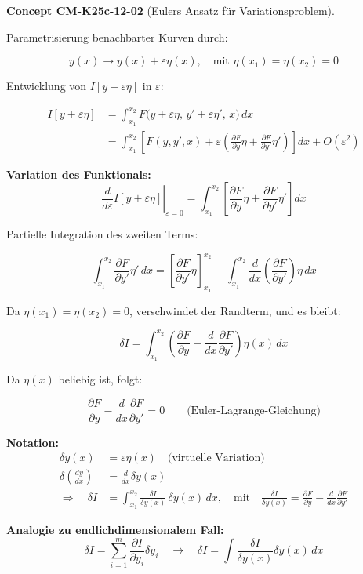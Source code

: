 \documentclass[10pt, letterpaper]{article}
\newcommand{\CustomHeading}[3]{%
  \par\medskip\noindent%
  \textbf{#1 #2} \textnormal{(#3)}.\enskip%
}
\newenvironment{CONC}[2]{\CustomHeading{Concept}{#1}{#2}}{}
\begin{document}
\begin{CONC}{CM-K25c-12-02}{Eulers Ansatz für Variationsproblem}
Parametrisierung benachbarter Kurven durch:

\[
y(x) \longrightarrow y(x) + \varepsilon \eta(x), \quad \text{mit } \eta(x_1) = \eta(x_2) = 0
\]

Entwicklung von \( I[y + \varepsilon \eta] \) in \( \varepsilon \):

\begin{align*}
I[y + \varepsilon \eta] &= \int_{x_1}^{x_2} F\big(y + \varepsilon \eta, \, y' + \varepsilon \eta', \, x\big)\, dx \\
&= \int_{x_1}^{x_2} \left[ F(y, y', x) + \varepsilon \left( \frac{\partial F}{\partial y}\eta + \frac{\partial F}{\partial y'}\eta' \right) \right] dx + O(\varepsilon^2)
\end{align*}

\textbf{Variation des Funktionals:}
\[
\left. \frac{d}{d\varepsilon} I[y + \varepsilon \eta] \right|_{\varepsilon=0} = \int_{x_1}^{x_2} \left[ \frac{\partial F}{\partial y} \eta + \frac{\partial F}{\partial y'} \eta' \right] dx
\]

Partielle Integration des zweiten Terms:

\[
\int_{x_1}^{x_2} \frac{\partial F}{\partial y'} \eta'\, dx = 
\left[ \frac{\partial F}{\partial y'} \eta \right]_{x_1}^{x_2}
- \int_{x_1}^{x_2} \frac{d}{dx} \left( \frac{\partial F}{\partial y'} \right) \eta\, dx
\]

Da \( \eta(x_1) = \eta(x_2) = 0 \), verschwindet der Randterm, und es bleibt:

\[
\delta I = \int_{x_1}^{x_2} \left( \frac{\partial F}{\partial y} - \frac{d}{dx} \frac{\partial F}{\partial y'} \right) \eta(x)\, dx
\]

Da \( \eta(x) \) beliebig ist, folgt:

\[
\boxed{
\frac{\partial F}{\partial y} - \frac{d}{dx} \frac{\partial F}{\partial y'} = 0
}
\qquad \text{(Euler-Lagrange-Gleichung)}
\]

\vspace{1em}
\textbf{Notation:}
\begin{align*}
\delta y(x) &= \varepsilon \eta(x) \quad \text{(virtuelle Variation)} \\
\delta \left( \frac{dy}{dx} \right) &= \frac{d}{dx} \delta y(x) \\
\Rightarrow \quad \delta I &= \int_{x_1}^{x_2} \frac{\delta I}{\delta y(x)}\, \delta y(x)\, dx, \quad 
\text{mit} \quad \frac{\delta I}{\delta y(x)} = \frac{\partial F}{\partial y} - \frac{d}{dx} \frac{\partial F}{\partial y'}
\end{align*}

\vspace{0.5em}
\textbf{Analogie zu endlichdimensionalem Fall:}
\[
\delta I = \sum_{i=1}^m \frac{\partial I}{\partial y_i} \delta y_i \quad 
\longrightarrow \quad 
\delta I = \int \frac{\delta I}{\delta y(x)} \delta y(x)\, dx
\]
\end{CONC}
\end{document}
